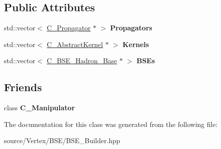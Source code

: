 \subsection*{Public Attributes}
\begin{DoxyCompactItemize}
\item 
\hypertarget{class_c___physical___state_a6640b0fbf6c6f4e49a92c4306bb3b348}{std\-::vector$<$ \hyperlink{class_c___propagator}{C\-\_\-\-Propagator} $\ast$ $>$ {\bfseries Propagators}}\label{class_c___physical___state_a6640b0fbf6c6f4e49a92c4306bb3b348}

\item 
\hypertarget{class_c___physical___state_aad6f9f3512e0daf39b18cec650222bb3}{std\-::vector$<$ \hyperlink{class_c___abstract_kernel}{C\-\_\-\-Abstract\-Kernel} $\ast$ $>$ {\bfseries Kernels}}\label{class_c___physical___state_aad6f9f3512e0daf39b18cec650222bb3}

\item 
\hypertarget{class_c___physical___state_ac6e3d6b9f17b0065316d54928cf6e747}{std\-::vector$<$ \hyperlink{class_c___b_s_e___hadron___base}{C\-\_\-\-B\-S\-E\-\_\-\-Hadron\-\_\-\-Base} $\ast$ $>$ {\bfseries B\-S\-Es}}\label{class_c___physical___state_ac6e3d6b9f17b0065316d54928cf6e747}

\end{DoxyCompactItemize}
\subsection*{Friends}
\begin{DoxyCompactItemize}
\item 
\hypertarget{class_c___physical___state_a2dae0cc9b2c5e453b211d44393071b36}{class {\bfseries C\-\_\-\-Manipulator}}\label{class_c___physical___state_a2dae0cc9b2c5e453b211d44393071b36}

\end{DoxyCompactItemize}


The documentation for this class was generated from the following file\-:\begin{DoxyCompactItemize}
\item 
source/\-Vertex/\-B\-S\-E/B\-S\-E\-\_\-\-Builder.\-hpp\end{DoxyCompactItemize}
